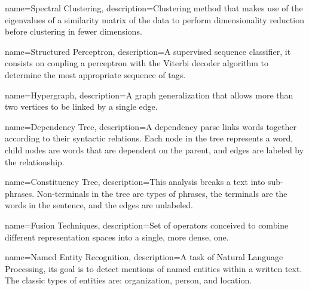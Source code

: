 {
    name=Spectral Clustering,
    description={Clustering method that makes use of the eigenvalues of a similarity matrix of the data to perform dimensionality reduction before clustering in fewer dimensions.}
}

{
    name=Structured Perceptron,
    description={A supervised sequence classifier, it consists on coupling a perceptron with the Viterbi decoder algorithm to determine the most appropriate sequence of tags.}
}

{
    name=Hypergraph,
    description={A graph generalization that allows more than two vertices to be linked by a single edge.}
}

{
    name=Dependency Tree,
    description={A dependency parse links words together according to their syntactic relations. Each node in the tree represents a word, child nodes are words that are dependent on the parent, and edges are labeled by the relationship.}
}

{
    name=Constituency Tree,
    description={This analysis breaks a text into sub-phrases. Non-terminals in the tree are types of phrases, the terminals are the words in the sentence, and the edges are unlabeled.}
}

{
    name=Fusion Techniques,
    description={Set of operators conceived to combine different representation spaces into a single, more dense, one.}
}

{
    name=Named Entity Recognition,
    description={A task of Natural Language Processing, its goal is to detect mentions of named entities within a written text. The classic types of entities are: organization, person, and location.}
}